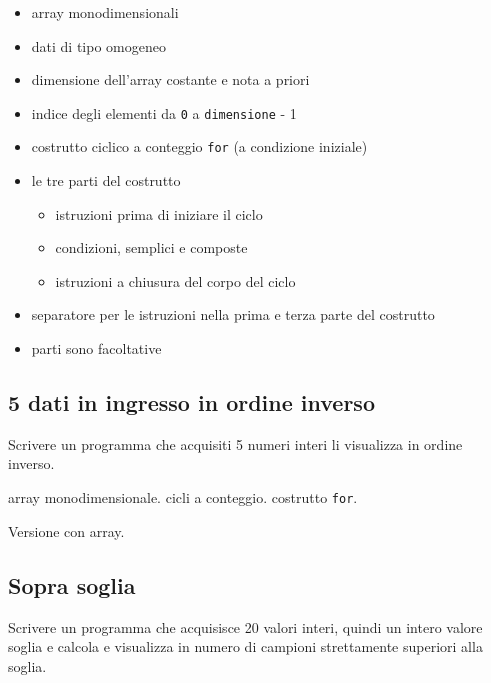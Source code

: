 \begin{itemize}
\item array monodimensionali
\item dati di tipo omogeneo
\item dimensione dell'array costante e nota a priori
\item indice degli elementi da \texttt{0} a \texttt{dimensione} - 1
\item costrutto ciclico a conteggio \texttt{for} (a condizione iniziale)
\item le tre parti del costrutto
\begin{itemize}
	\item istruzioni prima di iniziare il ciclo
	\item condizioni, semplici e composte
	\item istruzioni a chiusura del corpo del ciclo
  \end{itemize}
\item separatore per le istruzioni nella prima e terza parte del costrutto
\item parti sono facoltative
\end{itemize}

\mysep{}


\subsection{5 dati in ingresso in ordine inverso}
Scrivere un programma che acquisiti 5 numeri interi li visualizza in ordine inverso.

\begin{tags}
array monodimensionale. cicli a conteggio. costrutto \texttt{for}.
\end{tags}



Versione con array.




\subsection{Sopra soglia}
Scrivere un programma che acquisisce 20 valori interi, quindi un intero valore soglia e calcola e visualizza in numero di campioni strettamente superiori alla soglia.



